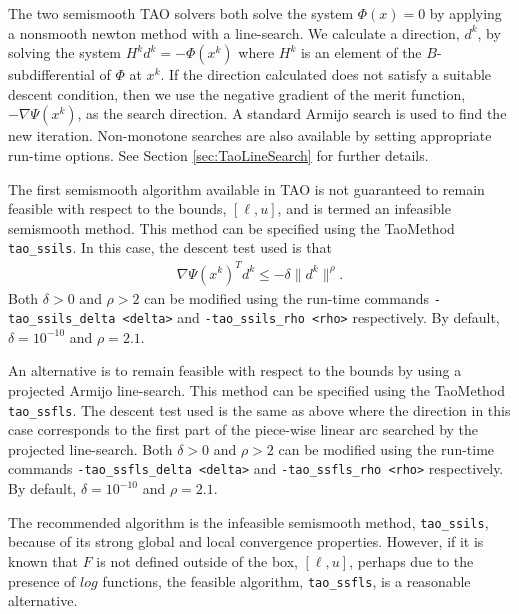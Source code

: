 The two semismooth TAO solvers both solve the system $\Phi(x) = 0$ by applying
a nonsmooth newton method with a line-search.  We calculate a direction, $d^k$,
by solving the system $H^kd^k = -\Phi(x^k)$ where $H^k$ is an element of the 
$B$-subdifferential \cite{qi.sun:nonsmooth} of $\Phi$ at $x^k$.  If the 
direction calculated does not satisfy a suitable descent condition, then 
we use the negative gradient of the merit function, $-\nabla \Psi(x^k)$, as 
the search direction.  A standard Armijo search \cite{armijo:minimization} is
used to find the new iteration.  Non-monotone searches 
\cite{grippo.lampariello.ea:nonmonotone} are also available by setting 
appropriate run-time options.  See Section \ref{sec:TaoLineSearch} for further 
details.

The first semismooth algorithm available in TAO is not guaranteed to 
remain feasible with respect to the bounds, $[\ell, u]$, and is termed 
an infeasible semismooth method.  This method can be specified using the 
TaoMethod {\tt tao\_ssils}.  In this case, the descent test used is 
that
\begin{eqnarray*}
\nabla \Psi(x^k)^Td^k \leq -\delta\| d^k \|^\rho.
\end{eqnarray*}
Both $\delta > 0$ and $\rho > 2$ can be modified using the
run-time commands {\tt -tao\_ssils\_delta <delta>} and 
{\tt -tao\_ssils\_rho <rho>} respectively. By default, 
$\delta = 10^{-10}$ and $\rho = 2.1$.

An alternative is to remain feasible with respect to the bounds by using a 
projected Armijo line-search.  This method can be specified using the 
TaoMethod {\tt tao\_ssfls}.  The descent test used is the same as above 
where the direction in this case corresponds to the first part of the 
piece-wise linear arc searched by the projected line-search.  
Both $\delta > 0$ and $\rho > 2$ can be modified using the run-time 
commands  {\tt -tao\_ssfls\_delta <delta>} and {\tt -tao\_ssfls\_rho <rho>} 
respectively.  By default, $\delta = 10^{-10}$ and $\rho = 2.1$.

The recommended algorithm is the infeasible semismooth method,
{\tt tao\_ssils}, because of its strong global and local convergence 
properties.  However, if it is known that $F$ is not defined outside 
of the box, $[\ell,u]$, perhaps due to the presence of $log$ functions,
the feasible algorithm, {\tt tao\_ssfls}, is a reasonable alternative.
